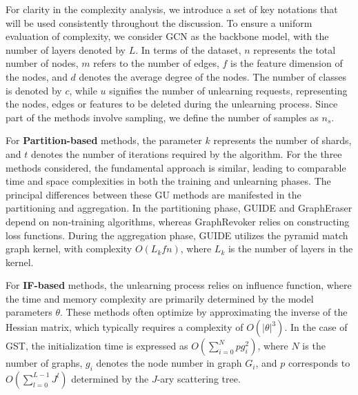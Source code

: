 For clarity in the complexity analysis, we introduce a set of key notations that will be used consistently throughout the discussion. To ensure a uniform evaluation of complexity, we consider GCN as the backbone model, with the number of layers denoted by $L$. In terms of the dataset, $n$ represents the total number of nodes, $m$ refers to the number of edges, $f$ is the feature dimension of the nodes, and $d$ denotes the average degree of the nodes. The number of classes is denoted by $c$, 
while $u$ signifies the number of unlearning requests, representing the nodes, edges or features to be deleted during the unlearning process. 
Since part of the methods involve sampling, we define the number of samples as $n_s$.



For \textbf{Partition-based} methods, the parameter $k$ represents the number of shards, 
and $t$ denotes the number of iterations required by the algorithm. For the three methods considered, the fundamental approach is similar, leading to comparable time and space complexities in both the training and unlearning phases. The principal differences between these GU methods are manifested in the partitioning and aggregation. In the partitioning phase, GUIDE and GraphEraser depend on non-training algorithms, whereas GraphRevoker relies on constructing loss functions. During the aggregation phase, GUIDE utilizes the pyramid match graph kernel, with complexity $ O(L_kfn)$, where $L_k$ is the number of layers in the kernel.


For \textbf{IF-based} methods, the unlearning process relies on influence function, where the time and memory complexity are primarily determined by the model parameters $\theta$. These methods often optimize by approximating the inverse of the Hessian matrix, which typically requires a complexity of $O(|\theta|^3)$. In the case of GST, the initialization time is expressed as $O(\sum_{i=0}^{N} pg_i^2)$, where $N$ is the number of graphs, $g_i$ denotes the node number in graph $G_i$, and $p$ corresponds to $O(\sum_{l=0}^{L-1} J^l)$ determined by the $J$-ary scattering tree.


